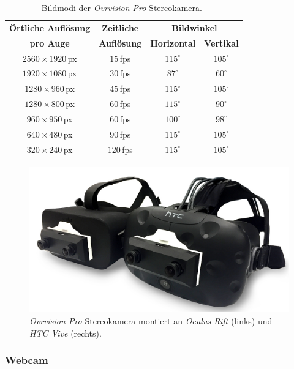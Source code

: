 \begin{table}
	\centering
	\begin{tabular}{|c|c|c|c|}
		\hline
		\Absatzbox{}
		\textbf{Örtliche Auflösung}& \textbf{Zeitliche} & \multicolumn{2}{c|}{\textbf{Bildwinkel}}\\
		\cline{3-4}
		\Absatzbox{}
		\textbf{pro Auge}& \textbf{Auflösung} & \textbf{Horizontal} & \textbf{Vertikal}\\
		\hline
		$2560\times1920$\,px & $15$\,fps & $115^\circ$ & $105^\circ$\\
		\hline
		$1920\times1080$\,px & $30$\,fps & $87^\circ$ & $60^\circ$\\
		\hline
		$1280\times960$\,px & $45$\,fps & $115^\circ$ & $105^\circ$\\
		\hline
		$1280\times800$\,px & $60$\,fps & $115^\circ$ & $90^\circ$\\
		\hline
		$960\times950$\,px & $60$\,fps & $100^\circ$ & $98^\circ$\\
		\hline
		$640\times480$\,px & $90$\,fps & $115^\circ$ & $105^\circ$\\
		\hline
		$320\times240$\,px & $120$\,fps & $115^\circ$ & $105^\circ$\\
		\hline
	\end{tabular}
	\caption{Bildmodi der \emph{Ovrvision Pro} Stereokamera.~\cite{website:ovrvisionProduct}}
	\label{tab:ovrRes}
\end{table}


\begin{figure}[H]
	\centering
	\includegraphics[width=\textwidth]{Bilder/ovr.jpg}			
		\caption{\emph{Ovrvision Pro} Stereokamera montiert an \emph{Oculus Rift} (links) und \emph{HTC Vive} (rechts).~\cite{website:ovrvision}}
		\label{fig:ovr}
\end{figure}
\subsubsection{Webcam}\label{sec:webcam} 


